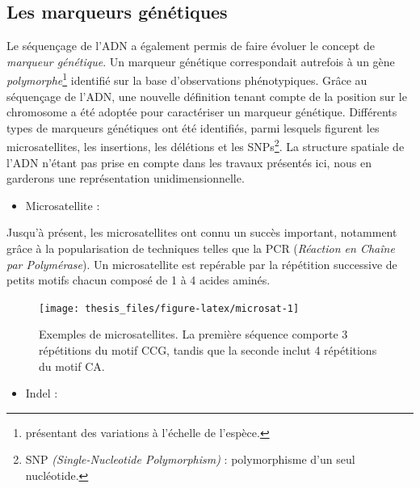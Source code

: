 \documentclass[12pt,a4paper,twoside]{ugathesis}
\providecommand{\tightlist}{%
  \setlength{\itemsep}{0pt}\setlength{\parskip}{0pt}}
\theoremstyle{definition}
\theoremstyle{definition}
\theoremstyle{remark}
\begin{document}
\subsection{Les marqueurs génétiques}\label{les-marqueurs-genetiques}

Le séquençage de l'ADN a également permis de faire évoluer le concept de
\emph{marqueur génétique}. Un marqueur génétique correspondait autrefois
à un gène \emph{polymorphe}\footnote{présentant des variations à
  l'échelle de l'espèce.} identifié sur la base d'observations
phénotypiques. Grâce au séquençage de l'ADN, une nouvelle définition
tenant compte de la position sur le chromosome a été adoptée pour
caractériser un marqueur génétique. Différents types de marqueurs
génétiques ont été identifiés, parmi lesquels figurent les
microsatellites, les insertions, les délétions et les SNPs\footnote{SNP
  \emph{(Single-Nucleotide Polymorphism)} : polymorphisme d'un seul
  nucléotide.}. La structure spatiale de l'ADN n'étant pas prise en
compte dans les travaux présentés ici, nous en garderons une
représentation unidimensionnelle.
\begin{itemize}
\tightlist
\item
  Microsatellite :
\end{itemize}
Jusqu'à présent, les microsatellites ont connu un succès important,
notamment grâce à la popularisation de techniques telles que la PCR
(\emph{Réaction en Chaîne par Polymérase}). Un microsatellite est
repérable par la répétition successive de petits motifs chacun composé
de 1 à 4 acides aminés.




\begin{figure}

{\centering \texttt{[image: thesis\_files/figure-latex/microsat-1]} 

}

\caption{Exemples de microsatellites. La première séquence
comporte 3 répétitions du motif CCG, tandis que la seconde inclut 4
répétitions du motif CA.}\label{fig:microsat}
\end{figure}
\begin{itemize}
\tightlist
\item
  Indel :
\end{itemize}
\end{document}
